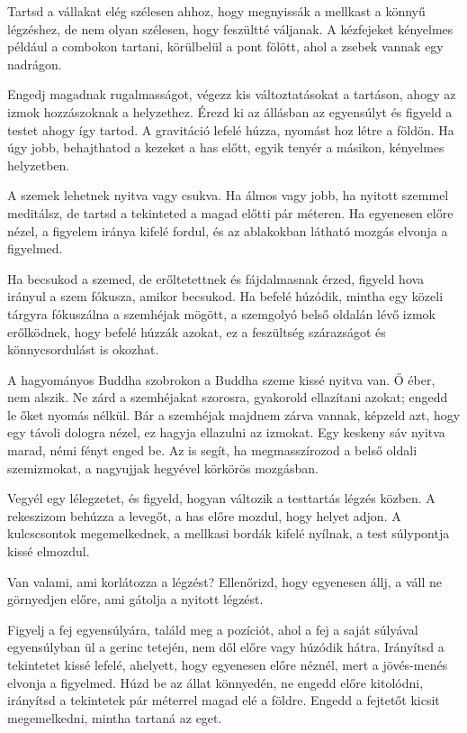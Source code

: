 Tartsd a vállakat elég szélesen ahhoz, hogy megnyissák a mellkast a
könnyű légzéshez, de nem olyan szélesen, hogy feszültté váljanak. A
kézfejeket kényelmes például a combokon tartani, körülbelül a pont
fölött, ahol a zsebek vannak egy nadrágon.

Engedj magadnak rugalmasságot, végezz kis változtatásokat a tartáson,
ahogy az izmok hozzászoknak a helyzethez. Érezd ki az állásban az
egyensúlyt és figyeld a testet ahogy így tartod. A gravitáció lefelé
húzza, nyomást hoz létre a földön. Ha úgy jobb, behajthatod a kezeket a
has előtt, egyik tenyér a másikon, kényelmes helyzetben.

A szemek lehetnek nyitva vagy csukva. Ha álmos vagy jobb, ha nyitott
szemmel meditálsz, de tartsd a tekinteted a magad előtti pár méteren. Ha
egyenesen előre nézel, a figyelem iránya kifelé fordul, és az ablakokban
látható mozgás elvonja a figyelmed.

Ha becsukod a szemed, de erőltetettnek és fájdalmasnak érzed, figyeld
hova irányul a szem fókusza, amikor becsukod. Ha befelé húzódik, mintha
egy közeli tárgyra fókuszálna a szemhéjak mögött, a szemgolyó belső
oldalán lévő izmok erőlködnek, hogy befelé húzzák azokat, ez a
feszültség szárazságot és könnycsordulást is okozhat.

A hagyományos Buddha szobrokon a Buddha szeme kissé nyitva van. Ő éber,
nem alszik. Ne zárd a szemhéjakat szorosra, gyakorold ellazítani azokat;
engedd le őket nyomás nélkül. Bár a szemhéjak majdnem zárva vannak,
képzeld azt, hogy egy távoli dologra nézel, ez hagyja ellazulni az
izmokat. Egy keskeny sáv nyitva marad, némi fényt enged be. Az is segít,
ha megmasszírozod a belső oldali szemizmokat, a nagyujjak hegyével
körkörös mozgásban.

Vegyél egy lélegzetet, és figyeld, hogyan változik a testtartás légzés
közben. A rekeszizom behúzza a levegőt, a has előre mozdul, hogy helyet
adjon. A kulcscsontok megemelkednek, a mellkasi bordák kifelé nyílnak, a
test súlypontja kissé elmozdul.

Van valami, ami korlátozza a légzést? Ellenőrizd, hogy egyenesen állj, a
váll ne görnyedjen előre, ami gátolja a nyitott légzést.

Figyelj a fej egyensúlyára, találd meg a pozíciót, ahol a fej a saját
súlyával egyensúlyban ül a gerinc tetején, nem dől előre vagy húzódik
hátra. Irányítsd a tekintetet kissé lefelé, ahelyett, hogy egyenesen
előre néznél, mert a jövés-menés elvonja a figyelmed. Húzd be az állat
könnyedén, ne engedd előre kitolódni, irányítsd a tekintetek pár
méterrel magad elé a földre. Engedd a fejtetőt kicsit megemelkedni,
mintha tartaná az eget.

